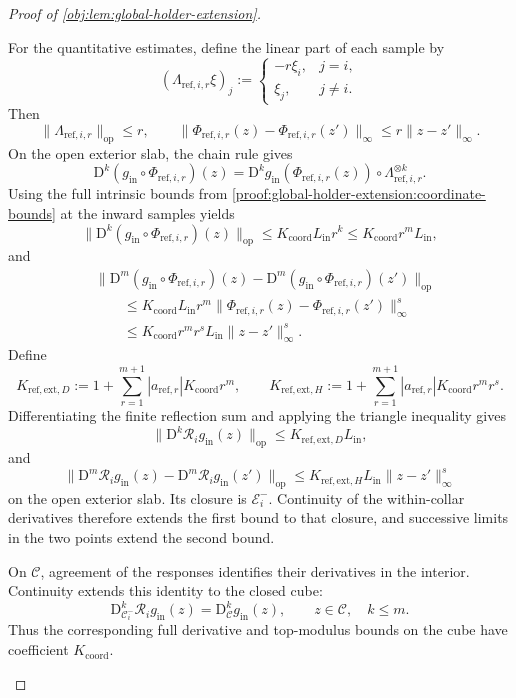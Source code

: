 \begin{proof}[Proof of \cref{obj:lem:global-holder-extension}]
\begin{enumerate}
For the quantitative estimates, define the linear part of each sample by
\[
(\Lambda_{\mathrm{ref},i,r}\xi)_j
:=
\begin{cases}
-r\xi_i,&j=i,\\
\xi_j,&j\ne i.
\end{cases}
\]
Then
\[
\|\Lambda_{\mathrm{ref},i,r}\|_{\mathrm{op}}\le r,
\qquad
\|\Phi_{\mathrm{ref},i,r}(z)-\Phi_{\mathrm{ref},i,r}(z')\|_\infty
\le r\|z-z'\|_\infty.
\]
On the open exterior slab, the chain rule gives
\[
\mathrm D^k(g_{\mathrm{in}}\circ\Phi_{\mathrm{ref},i,r})(z)
=
\mathrm D^k g_{\mathrm{in}}(\Phi_{\mathrm{ref},i,r}(z))
\circ\Lambda_{\mathrm{ref},i,r}^{\otimes k}.
\]
Using the full intrinsic bounds from \cref{proof:global-holder-extension:coordinate-bounds} at the inward samples yields
\[
\|\mathrm D^k(g_{\mathrm{in}}\circ\Phi_{\mathrm{ref},i,r})(z)\|_{\mathrm{op}}
\le K_{\mathrm{coord}}L_{\mathrm{in}}r^k
\le K_{\mathrm{coord}}r^mL_{\mathrm{in}},
\]
and
\[
\begin{aligned}
&\|\mathrm D^m(g_{\mathrm{in}}\circ\Phi_{\mathrm{ref},i,r})(z)
-\mathrm D^m(g_{\mathrm{in}}\circ\Phi_{\mathrm{ref},i,r})(z')\|_{\mathrm{op}}\\
&\qquad\le
K_{\mathrm{coord}}L_{\mathrm{in}}r^m
\|\Phi_{\mathrm{ref},i,r}(z)-\Phi_{\mathrm{ref},i,r}(z')\|_\infty^s\\
&\qquad\le K_{\mathrm{coord}}r^mr^sL_{\mathrm{in}}\|z-z'\|_\infty^s.
\end{aligned}
\]
Define
\[
K_{\mathrm{ref},\mathrm{ext},D}
:=1+\sum_{r=1}^{m+1}|a_{\mathrm{ref},r}|K_{\mathrm{coord}}r^m,
\qquad
K_{\mathrm{ref},\mathrm{ext},H}
:=1+\sum_{r=1}^{m+1}|a_{\mathrm{ref},r}|K_{\mathrm{coord}}r^mr^s.
\]
Differentiating the finite reflection sum and applying the triangle inequality gives
\[
\|\mathrm D^k\mathscr R_i g_{\mathrm{in}}(z)\|_{\mathrm{op}}
\le K_{\mathrm{ref},\mathrm{ext},D}L_{\mathrm{in}},
\]
and
\[
\|\mathrm D^m\mathscr R_i g_{\mathrm{in}}(z)
-\mathrm D^m\mathscr R_i g_{\mathrm{in}}(z')\|_{\mathrm{op}}
\le K_{\mathrm{ref},\mathrm{ext},H}L_{\mathrm{in}}\|z-z'\|_\infty^s
\]
on the open exterior slab. Its closure is \(\mathcal E_i^-\). Continuity of the within-collar derivatives therefore extends the first bound to that closure, and successive limits in the two points extend the second bound.

On \(\mathcal C\), agreement of the responses identifies their derivatives in the interior. Continuity extends this identity to the closed cube:
\[
\mathrm D_{\mathcal C_i^-}^k\mathscr R_i g_{\mathrm{in}}(z)
=\mathrm D_{\mathcal C}^k g_{\mathrm{in}}(z),
\qquad z\in\mathcal C,\quad k\le m.
\]
Thus the corresponding full derivative and top-modulus bounds on the cube have coefficient \(K_{\mathrm{coord}}\).


\end{enumerate}
\end{proof}
